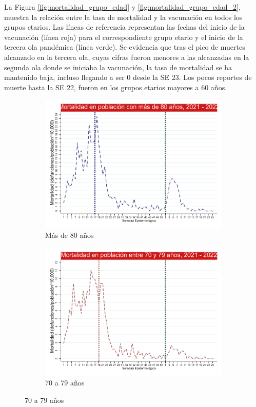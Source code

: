 \documentclass[12pt,a4paper,openany]{book}
\begin{document}
	
	La Figura \ref{fig:mortalidad_grupo_edad} y 
	\ref{fig:mortalidad_grupo_edad_2},
	muestra la relación entre la tasa de mortalidad y la vacunación en todos los grupos etarios. Las líneas de referencia  representan las fechas del inicio de la vacunación (línea roja) para el correspondiente grupo etario y el inicio de la tercera ola pandémica (línea verde). Se evidencia que tras el pico de muertes alcanzado en la tercera ola, cuyas cifras fueron menores a las alcanzadas en la segunda ola donde se iniciaba la vacunación, la tasa de mortalidad se ha mantenido baja,	
	incluso llegando a ser 0 desde la SE 23.
	Los pocos reportes de muerte hasta la SE 22, fueron en los grupos etarios mayores a 60 años.
	
	\begin{figure}[h]
		\caption{Tasa de Mortalidad por COVID-19 por Grupo Etario hasta la SE 25-2022.}
		\label{fig:mortalidad_grupo_edad}
		\centering
		\begin{subfigure}[b]{0.45\textwidth}
			\centering
			\includegraphics[width=\textwidth]{../figuras/mortalidad_edad_80.pdf}
			\caption{Más de 80 años}
		\end{subfigure}
		\hfill
		\begin{subfigure}[b]{0.45\textwidth}
			\centering
			\includegraphics[width=\textwidth]{../figuras/mortalidad_edad_70.pdf}
			\caption{70 a 79 años}
		\end{subfigure}
		

\end{figure}
\end{document}
